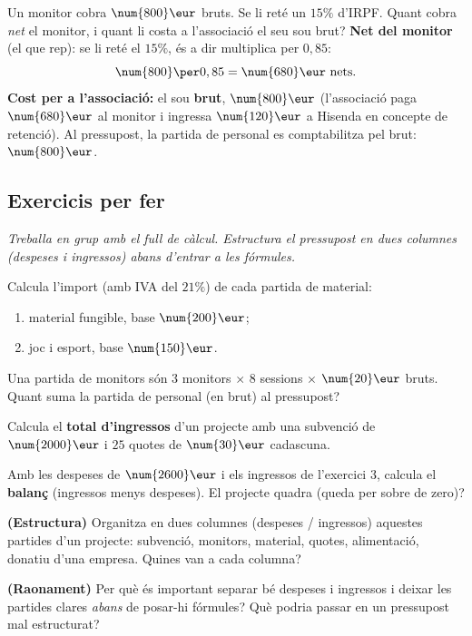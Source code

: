 \begin{exresolt}
Un monitor cobra $\num{800}\eur$ bruts. Se li reté un $15\%$ d'IRPF. Quant cobra
\emph{net} el monitor, i quant li costa a l'associació el seu sou brut?
\solucio
\textbf{Net del monitor} (el que rep): se li reté el $15\%$, és a dir multiplica per
$0,85$:
\[
\num{800}\per 0,85=\num{680}\eur \text{ nets}.
\]
\textbf{Cost per a l'associació:} el sou \textbf{brut}, $\num{800}\eur$ (l'associació
paga $\num{680}\eur$ al monitor i ingressa $\num{120}\eur$ a Hisenda en concepte de
retenció). Al pressupost, la partida de personal es comptabilitza pel brut:
$\num{800}\eur$.
\end{exresolt}

\subsection{Exercicis per fer}

\noindent\textit{Treballa en grup amb el full de càlcul. Estructura el pressupost en
dues columnes (despeses i ingressos) abans d'entrar a les fórmules.}

\begin{exercicis}
\begin{exlist}
  \item Calcula l'import (amb IVA del $21\%$) de cada partida de material:
    \begin{enumerate}[label=\alph*), leftmargin=1.6em, topsep=2pt]
      \item material fungible, base $\num{200}\eur$;
      \item joc i esport, base $\num{150}\eur$.
    \end{enumerate}
  \item Una partida de monitors són $3$ monitors $\times$ $8$ sessions $\times$
        $\num{20}\eur$ bruts. Quant suma la partida de personal (en brut) al pressupost?
  \item Calcula el \textbf{total d'ingressos} d'un projecte amb una subvenció de
        $\num{2000}\eur$ i $25$ quotes de $\num{30}\eur$ cadascuna.
  \item Amb les despeses de $\num{2600}\eur$ i els ingressos de l'exercici 3, calcula el
        \textbf{balanç} (ingressos menys despeses). El projecte quadra (queda per sobre
        de zero)?
  \item \textbf{(Estructura)} Organitza en dues columnes (despeses / ingressos) aquestes
        partides d'un projecte: subvenció, monitors, material, quotes, alimentació,
        donatiu d'una empresa. Quines van a cada columna?
  \item \textbf{(Raonament)} Per què és important separar bé despeses i ingressos i
        deixar les partides clares \emph{abans} de posar-hi fórmules? Què podria passar
        en un pressupost mal estructurat?
\end{exlist}
\end{exercicis}

